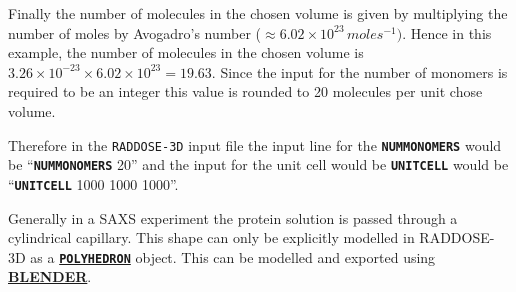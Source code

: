 \documentclass[a4paper]{article}
\newcommand{\RD}{\texttt{RADDOSE-3D}\xspace}
\newcommand{\Keyword}[1]{\texttt{\textbf{#1}}\xspace}
\begin{document}
Finally the number of molecules in the chosen volume is given by multiplying the number of moles by Avogadro's number ($\approx 6.02 \times 10^{23}\,moles^{-1})$. Hence in this example, the number of molecules in the chosen volume is $3.26 \times 10^{-23} \times 6.02 \times 10^{23} = 19.63$. Since the input for the number of monomers is required to be an integer this value is rounded to 20 molecules per unit chose volume.

Therefore in the \RD input file the input line for the \Keyword{NUMMONOMERS} would be ``\Keyword{NUMMONOMERS} 20'' and the input for the unit cell would be \Keyword{UNITCELL} would be ``\Keyword{UNITCELL} 1000 1000 1000''.

Generally in a SAXS experiment the protein solution is passed through a cylindrical capillary. This shape can only be explicitly modelled in RADDOSE-3D as a \hyperref[crystaltype]{\Keyword{POLYHEDRON}} object. This can be modelled and exported using \href{http://www.blender.org/}{\textbf{BLENDER}}.
\end{document}

